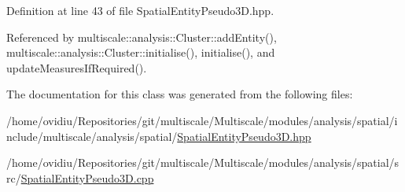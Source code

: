 \-Definition at line 43 of file \-Spatial\-Entity\-Pseudo3\-D.\-hpp.



\-Referenced by multiscale\-::analysis\-::\-Cluster\-::add\-Entity(), multiscale\-::analysis\-::\-Cluster\-::initialise(), initialise(), and update\-Measures\-If\-Required().



\-The documentation for this class was generated from the following files\-:\begin{DoxyCompactItemize}
\item 
/home/ovidiu/\-Repositories/git/multiscale/\-Multiscale/modules/analysis/spatial/include/multiscale/analysis/spatial/\hyperlink{SpatialEntityPseudo3D_8hpp}{\-Spatial\-Entity\-Pseudo3\-D.\-hpp}\item 
/home/ovidiu/\-Repositories/git/multiscale/\-Multiscale/modules/analysis/spatial/src/\hyperlink{SpatialEntityPseudo3D_8cpp}{\-Spatial\-Entity\-Pseudo3\-D.\-cpp}\end{DoxyCompactItemize}
